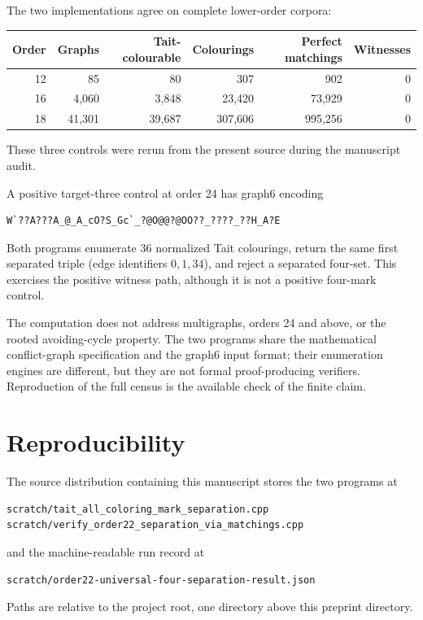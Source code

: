 \documentclass[11pt]{article}
\theoremstyle{definition}
\theoremstyle{remark}
\begin{document}
The two implementations agree on complete lower-order corpora:
\begin{center}
\begin{tabular}{@{}rrrrrr@{}}
\toprule
Order & Graphs & Tait-colourable & Colourings & Perfect matchings
  & Witnesses\\
\midrule
12 & 85 & 80 & 307 & 902 & 0\\
16 & 4,060 & 3,848 & 23,420 & 73,929 & 0\\
18 & 41,301 & 39,687 & 307,606 & 995,256 & 0\\
\bottomrule
\end{tabular}
\end{center}
These three controls were rerun from the present source during the
manuscript audit.

A positive target-three control at order 24 has graph6 encoding
\begin{verbatim}
W`??A???A_@_A_cO?S_Gc`_?@O@@?@OO??_????_??H_A?E
\end{verbatim}
Both programs enumerate 36 normalized Tait colourings, return the same
first separated triple (edge identifiers \(0,1,34\)), and reject a
separated four-set.  This exercises the positive witness path, although
it is not a positive four-mark control.

The computation does not address multigraphs, orders 24 and above, or
the rooted avoiding-cycle property.  The two programs share the
mathematical conflict-graph specification and the graph6 input format;
their enumeration engines are different, but they are not formal
proof-producing verifiers.  Reproduction of the full census is the
available check of the finite claim.

\section{Reproducibility}

The source distribution containing this manuscript stores the two
programs at
\begin{verbatim}
scratch/tait_all_coloring_mark_separation.cpp
scratch/verify_order22_separation_via_matchings.cpp
\end{verbatim}
and the machine-readable run record at
\begin{verbatim}
scratch/order22-universal-four-separation-result.json
\end{verbatim}
Paths are relative to the project root, one directory above this
preprint directory.
\end{document}
